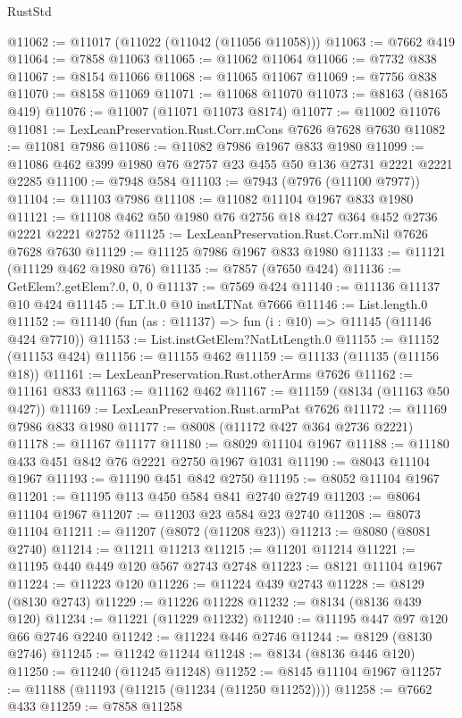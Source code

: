 \begin{lexlean}{RustStd}
\begin{coremodule}
{\begin{coremodule}
{{{{{{{{{{{{{{{{{{{{{{{{{{{{{{{{{{{{{{{{{{{{{{{{{{{{{@11062 := @11017 (@11022 (@11042 (@11056 @11058)))
@11063 := @7662 @419
@11064 := @7858 @11063
@11065 := @11062 @11064
@11066 := @7732 @838
@11067 := @8154 @11066
@11068 := @11065 @11067
@11069 := @7756 @838
@11070 := @8158 @11069
@11071 := @11068 @11070
@11073 := @8163 (@8165 @419)
@11076 := @11007 (@11071 @11073 @8174)
@11077 := @11002 @11076
@11081 := LexLeanPreservation.Rust.Corr.mCons @7626 @7628 @7630
@11082 := @11081 @7986
@11086 := @11082 @7986 @1967 @833 @1980
@11099 := @11086 @462 @399 @1980 @76 @2757 @23 @455 @50 @136 @2731 @2221 @2221 @2285
@11100 := @7948 @584
@11103 := @7943 (@7976 (@11100 @7977))
@11104 := @11103 @7986
@11108 := @11082 @11104 @1967 @833 @1980
@11121 := @11108 @462 @50 @1980 @76 @2756 @18 @427 @364 @452 @2736 @2221 @2221 @2752
@11125 := LexLeanPreservation.Rust.Corr.mNil @7626 @7628 @7630
@11129 := @11125 @7986 @1967 @833 @1980
@11133 := @11121 (@11129 @462 @1980 @76)
@11135 := @7857 (@7650 @424)
@11136 := GetElem?.getElem?.{0, 0, 0}
@11137 := @7569 @424
@11140 := @11136 @11137 @10 @424
@11145 := LT.lt.{0} @10 instLTNat @7666
@11146 := List.length.{0}
@11152 := @11140 (fun (as : @11137) => fun (i : @10) => @11145 (@11146 @424 @7710))
@11153 := List.instGetElem?NatLtLength.{0}
@11155 := @11152 (@11153 @424)
@11156 := @11155 @462
@11159 := @11133 (@11135 (@11156 @18))
@11161 := LexLeanPreservation.Rust.otherArms @7626
@11162 := @11161 @833
@11163 := @11162 @462
@11167 := @11159 (@8134 (@11163 @50 @427))
@11169 := LexLeanPreservation.Rust.armPat @7626
@11172 := @11169 @7986 @833 @1980
@11177 := @8008 (@11172 @427 @364 @2736 @2221)
@11178 := @11167 @11177
@11180 := @8029 @11104 @1967
@11188 := @11180 @433 @451 @842 @76 @2221 @2750 @1967 @1031
@11190 := @8043 @11104 @1967
@11193 := @11190 @451 @842 @2750
@11195 := @8052 @11104 @1967
@11201 := @11195 @113 @450 @584 @841 @2740 @2749
@11203 := @8064 @11104 @1967
@11207 := @11203 @23 @584 @23 @2740
@11208 := @8073 @11104
@11211 := @11207 (@8072 (@11208 @23))
@11213 := @8080 (@8081 @2740)
@11214 := @11211 @11213
@11215 := @11201 @11214
@11221 := @11195 @440 @449 @120 @567 @2743 @2748
@11223 := @8121 @11104 @1967
@11224 := @11223 @120
@11226 := @11224 @439 @2743
@11228 := @8129 (@8130 @2743)
@11229 := @11226 @11228
@11232 := @8134 (@8136 @439 @120)
@11234 := @11221 (@11229 @11232)
@11240 := @11195 @447 @97 @120 @66 @2746 @2240
@11242 := @11224 @446 @2746
@11244 := @8129 (@8130 @2746)
@11245 := @11242 @11244
@11248 := @8134 (@8136 @446 @120)
@11250 := @11240 (@11245 @11248)
@11252 := @8145 @11104 @1967
@11257 := @11188 (@11193 (@11215 (@11234 (@11250 @11252))))
@11258 := @7662 @433
@11259 := @7858 @11258
}}}}}}}}}}}}}}}}}}}}}}}}}}}}}}}}}}}}}}}}}}}}}}}}}}}}}
\end{coremodule}}
\end{coremodule}
\end{lexlean}
